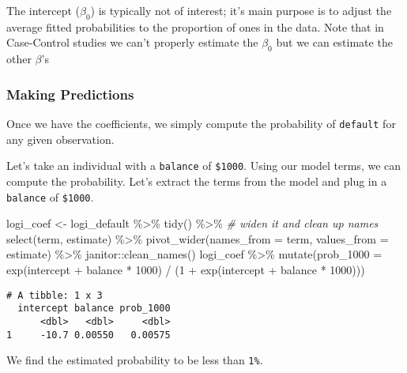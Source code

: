 \documentclass[
]{article}
\newenvironment{Shaded}{\begin{snugshade}}{\end{snugshade}}
\newcommand{\AttributeTok}[1]{\textcolor[rgb]{0.77,0.63,0.00}{#1}}
\newcommand{\CommentTok}[1]{\textcolor[rgb]{0.56,0.35,0.01}{\textit{#1}}}
\newcommand{\DecValTok}[1]{\textcolor[rgb]{0.00,0.00,0.81}{#1}}
\newcommand{\FunctionTok}[1]{\textcolor[rgb]{0.00,0.00,0.00}{#1}}
\newcommand{\NormalTok}[1]{#1}
\newcommand{\OtherTok}[1]{\textcolor[rgb]{0.56,0.35,0.01}{#1}}
\newcommand{\SpecialCharTok}[1]{\textcolor[rgb]{0.00,0.00,0.00}{#1}}
\begin{document}
The intercept (\(\beta_0\)) is typically not of interest; it's main
purpose is to adjust the average fitted probabilities to the proportion
of ones in the data. Note that in Case-Control studies we can't properly
estimate the \(\beta_0\) but we can estimate the other \(\beta\)'s

\hypertarget{making-predictions}{%
\subsubsection{Making Predictions}\label{making-predictions}}

Once we have the coefficients, we simply compute the probability of
\texttt{default} for any given observation.

Let's take an individual with a \texttt{balance} of \texttt{\$1000}.
Using our model terms, we can compute the probability. Let's extract the
terms from the model and plug in a \texttt{balance} of \texttt{\$1000}.

\begin{Shaded}
\begin{Highlighting}[]
\NormalTok{logi\_coef }\OtherTok{\textless{}{-}}\NormalTok{ logi\_default }\SpecialCharTok{\%\textgreater{}\%}
  \FunctionTok{tidy}\NormalTok{() }\SpecialCharTok{\%\textgreater{}\%}
  \CommentTok{\# widen it and clean up names}
  \FunctionTok{select}\NormalTok{(term, estimate) }\SpecialCharTok{\%\textgreater{}\%}
  \FunctionTok{pivot\_wider}\NormalTok{(}\AttributeTok{names\_from =}\NormalTok{ term, }\AttributeTok{values\_from =}\NormalTok{ estimate) }\SpecialCharTok{\%\textgreater{}\%}
\NormalTok{  janitor}\SpecialCharTok{::}\FunctionTok{clean\_names}\NormalTok{()}
\NormalTok{logi\_coef }\SpecialCharTok{\%\textgreater{}\%}
  \FunctionTok{mutate}\NormalTok{(}\AttributeTok{prob\_1000 =} \FunctionTok{exp}\NormalTok{(intercept }\SpecialCharTok{+}\NormalTok{ balance }\SpecialCharTok{*} \DecValTok{1000}\NormalTok{) }\SpecialCharTok{/}
\NormalTok{           (}\DecValTok{1} \SpecialCharTok{+} \FunctionTok{exp}\NormalTok{(intercept }\SpecialCharTok{+}\NormalTok{ balance }\SpecialCharTok{*} \DecValTok{1000}\NormalTok{)))}
\end{Highlighting}
\end{Shaded}

\begin{verbatim}
# A tibble: 1 x 3
  intercept balance prob_1000
      <dbl>   <dbl>     <dbl>
1     -10.7 0.00550   0.00575
\end{verbatim}

We find the estimated probability to be less than \texttt{1\%}.
\end{document}
